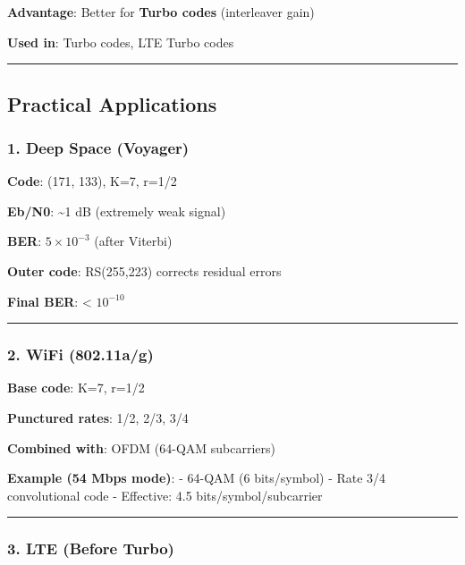 \textbf{Advantage}: Better for \textbf{Turbo codes} (interleaver gain)

\textbf{Used in}: Turbo codes, LTE Turbo codes

\begin{center}\rule{0.5\linewidth}{0.5pt}\end{center}

\subsection{Practical Applications}\label{practical-applications}

\subsubsection{1. Deep Space (Voyager)}\label{deep-space-voyager}

\textbf{Code}: (171, 133), K=7, r=1/2

\textbf{Eb/N0}: \textasciitilde1 dB (extremely weak signal)

\textbf{BER}: \(5 \times 10^{-3}\) (after Viterbi)

\textbf{Outer code}: RS(255,223) corrects residual errors

\textbf{Final BER}: \textless{} \(10^{-10}\)

\begin{center}\rule{0.5\linewidth}{0.5pt}\end{center}

\subsubsection{2. WiFi (802.11a/g)}\label{wifi-802.11ag}

\textbf{Base code}: K=7, r=1/2

\textbf{Punctured rates}: 1/2, 2/3, 3/4

\textbf{Combined with}: OFDM (64-QAM subcarriers)

\textbf{Example (54 Mbps mode)}: - 64-QAM (6 bits/symbol) - Rate 3/4
convolutional code - Effective: 4.5 bits/symbol/subcarrier

\begin{center}\rule{0.5\linewidth}{0.5pt}\end{center}

\subsubsection{3. LTE (Before Turbo)}\label{lte-before-turbo}

